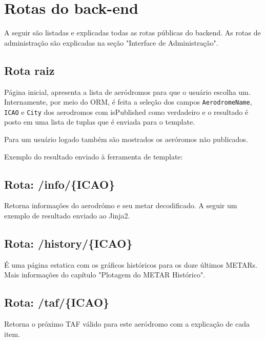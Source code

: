 \chapter{Rotas do back-end}

A seguir são listadas e explicadas todas as rotas públicas do backend. As
rotas de administração são explicadas na seção "Interface de Administração".

\section{Rota raiz}

Página inicial, apresenta a lista de aeródromos para que o usuário escolha um. 
Internamente, por meio do ORM, é feita a seleção dos campos \texttt{AerodromeName},
\texttt{ICAO} e \texttt{City} dos aerodromos com isPublished como verdadeiro e o
 resultado é posto em uma lista de tuplas que é enviada para o template.

Para um usuário logado também são mostrados os aeróromos não publicados.

Exemplo do resultado enviado à ferramenta de template:




\section{Rota: /info/\{ICAO\}}

Retorna informações do aerodrómo e seu metar decodificado. A seguir um exemplo
de resultado enviado ao Jinja2.




\section{Rota: /history/\{ICAO\}}
É uma página estatica com os gráficos históricos para os doze últimos METARs.
Mais informações do capítulo "Plotagem do METAR Histórico".


\section{Rota: /taf/\{ICAO\}}
Retorna o próximo TAF válido para este aeródromo com a explicação de cada item.

